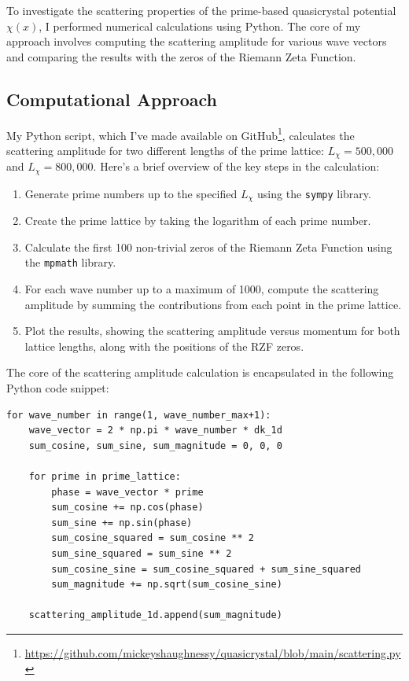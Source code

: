 \documentclass[11pt, oneside]{article}
\begin{document}
To investigate the scattering properties of the prime-based quasicrystal potential $\chi(x)$, I performed numerical calculations using Python. The core of my approach involves computing the scattering amplitude for various wave vectors and comparing the results with the zeros of the Riemann Zeta Function.

\subsection{Computational Approach}

My Python script, which I've made available on GitHub\footnote{\url{https://github.com/mickeyshaughnessy/quasicrystal/blob/main/scattering.py}}, calculates the scattering amplitude for two different lengths of the prime lattice: $L_\chi = 500,000$ and $L_\chi = 800,000$. Here's a brief overview of the key steps in the calculation:

\begin{enumerate}
    \item Generate prime numbers up to the specified $L_\chi$ using the \texttt{sympy} library.
    \item Create the prime lattice by taking the logarithm of each prime number.
    \item Calculate the first 100 non-trivial zeros of the Riemann Zeta Function using the \texttt{mpmath} library.
    \item For each wave number up to a maximum of 1000, compute the scattering amplitude by summing the contributions from each point in the prime lattice.
    \item Plot the results, showing the scattering amplitude versus momentum for both lattice lengths, along with the positions of the RZF zeros.
\end{enumerate}

The core of the scattering amplitude calculation is encapsulated in the following Python code snippet:

\begin{verbatim}
for wave_number in range(1, wave_number_max+1):
    wave_vector = 2 * np.pi * wave_number * dk_1d
    sum_cosine, sum_sine, sum_magnitude = 0, 0, 0

    for prime in prime_lattice:
        phase = wave_vector * prime
        sum_cosine += np.cos(phase)
        sum_sine += np.sin(phase)
        sum_cosine_squared = sum_cosine ** 2
        sum_sine_squared = sum_sine ** 2
        sum_cosine_sine = sum_cosine_squared + sum_sine_squared
        sum_magnitude += np.sqrt(sum_cosine_sine)

    scattering_amplitude_1d.append(sum_magnitude)
\end{verbatim}
\end{document}
